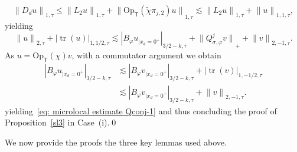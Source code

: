 \documentclass[JEP,XML,SOM,Unicode,published]{cedram}
\theoremstyle{plain}
\theoremstyle{definition}
\newcommand{\tchi}{\tilde{\chi}}
\newcommand{\br}{\ensuremath{_{|x_d=0^+}}}
\newcommand{\Opt}{\ensuremath{\mathrm{Op}_{\scriptscriptstyle{\mathsf{T}}}}}
\newcommand{\Norm}[2]{{\| #1 \|}_{#2}}
\newcommand{\Normsc}[2]{{\| #1 \|}_{#2, \tau}}
\newcommand{\normsc}[2]{{| #1 |}_{#2, \tau}}
\newcommand{\bignormsc}[2]{{\big| #1 \big|}_{#2, \tau}}
\newcommand{\Qconj}{Q_{\sigma,\varphi}}
\DeclareMathOperator{\trace}{tr}
\begin{document}
\begin{equation*}
\Normsc{D_du}{1} \leq
\Normsc{L_2 u}{1} + \Normsc{\Opt(\tchi \pi_{j,2}) u}{1}
\lesssim
\Normsc{L_2 u}{1} + \Normsc{u}{1,1},
\end{equation*}
yielding
\begin{equation*}
\Normsc{u}{2} + \bignormsc{\trace (u)}{1,1/2}
\lesssim
\normsc{B_{\varphi}u\br}{3/2-k}
+ \Norm{\Qconj^jv}{+}
+\Normsc{v}{2,-1}.
\end{equation*}
As $u=\Opt(\chi)v$, with a commutator argument we obtain
\begin{align*}
\normsc{B_{\varphi}u\br}{3/2-k}
& \lesssim
\normsc{B_{\varphi}v\br}{3/2-k}
+ \normsc{\trace(v)}{1,-1/2}\\
& \lesssim
\normsc{B_{\varphi}v\br}{3/2-k}
+ \Normsc{v}{2,-1}.
\end{align*}
yielding~\eqref{eq: microlocal estimate Qconj-1} and
thus concluding the proof of
Proposition~\ref{sl3} in Case~(i).\qed

\medskip
We now provide the proofs the three key lemmas used above.
\end{document}
